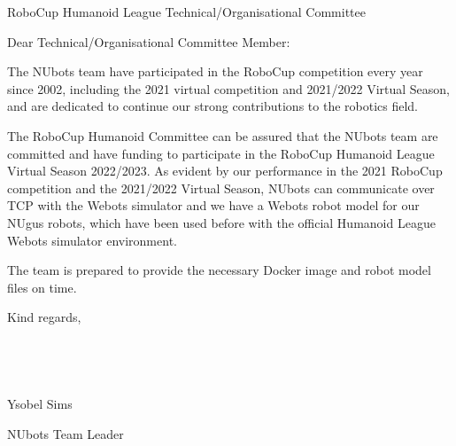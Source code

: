 \documentclass{letter}
\begin{document}
\begin{letter}{RoboCup Humanoid League Technical/Organisational Committee}
\opening{Dear Technical/Organisational Committee Member:}

The NUbots team have participated in the RoboCup competition every year since 2002, including the 2021 virtual competition and 2021/2022 Virtual Season, and are dedicated to continue our strong contributions to the robotics field.

The RoboCup Humanoid Committee can be assured that the NUbots team are committed and have funding to participate in the RoboCup Humanoid League Virtual Season 2022/2023. As evident by our performance in the 2021 RoboCup competition and the 2021/2022 Virtual Season, NUbots can communicate over TCP with the Webots simulator and we have a Webots robot model for our NUgus robots, which have been used before with the official Humanoid League Webots simulator environment.

The team is prepared to provide the necessary Docker image and robot model files on time.

Kind regards, \\ \\ \\ \\ \\ 

\hspace*{20pt} Ysobel Sims

NUbots Team Leader

\end{letter}
\end{document}
